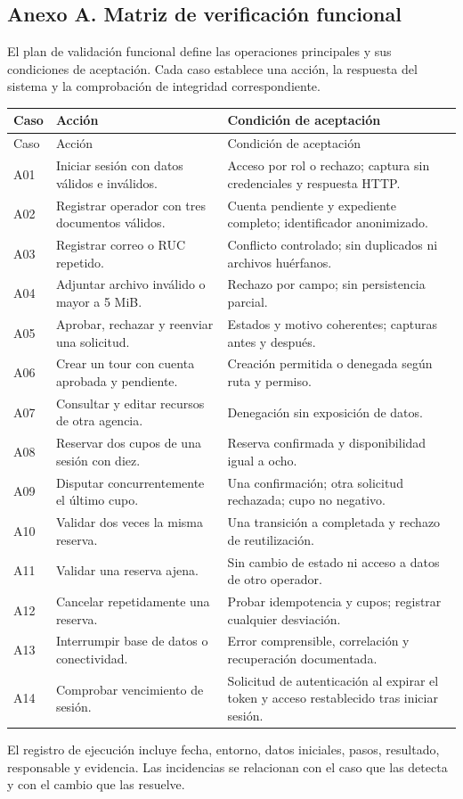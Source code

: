 \subsection*{Anexo A. Matriz de verificación funcional}
El plan de validación funcional define las operaciones principales y sus condiciones de aceptación. Cada caso establece una acción, la respuesta del sistema y la comprobación de integridad correspondiente.
\begin{longtable}{@{}P{1cm}P{4.5cm}P{6.8cm}@{}}
\toprule Caso & Acción & Condición de aceptación \\ \midrule\endfirsthead
\toprule Caso & Acción & Condición de aceptación \\ \midrule\endhead
A01 & Iniciar sesión con datos válidos e inválidos. & Acceso por rol o rechazo; captura sin credenciales y respuesta HTTP. \\
A02 & Registrar operador con tres documentos válidos. & Cuenta pendiente y expediente completo; identificador anonimizado. \\
A03 & Registrar correo o RUC repetido. & Conflicto controlado; sin duplicados ni archivos huérfanos. \\
A04 & Adjuntar archivo inválido o mayor a 5 MiB. & Rechazo por campo; sin persistencia parcial. \\
A05 & Aprobar, rechazar y reenviar una solicitud. & Estados y motivo coherentes; capturas antes y después. \\
A06 & Crear un tour con cuenta aprobada y pendiente. & Creación permitida o denegada según ruta y permiso. \\
A07 & Consultar y editar recursos de otra agencia. & Denegación sin exposición de datos. \\
A08 & Reservar dos cupos de una sesión con diez. & Reserva confirmada y disponibilidad igual a ocho. \\
A09 & Disputar concurrentemente el último cupo. & Una confirmación; otra solicitud rechazada; cupo no negativo. \\
A10 & Validar dos veces la misma reserva. & Una transición a completada y rechazo de reutilización. \\
A11 & Validar una reserva ajena. & Sin cambio de estado ni acceso a datos de otro operador. \\
A12 & Cancelar repetidamente una reserva. & Probar idempotencia y cupos; registrar cualquier desviación. \\
A13 & Interrumpir base de datos o conectividad. & Error comprensible, correlación y recuperación documentada. \\
A14 & Comprobar vencimiento de sesión. & Solicitud de autenticación al expirar el token y acceso restablecido tras iniciar sesión. \\
\bottomrule
\end{longtable}
El registro de ejecución incluye fecha, entorno, datos iniciales, pasos, resultado, responsable y evidencia. Las incidencias se relacionan con el caso que las detecta y con el cambio que las resuelve.

